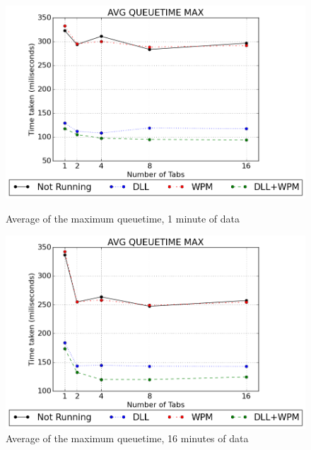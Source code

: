 \begin{figure}[h]
	\centering
    \includegraphics[width=\textwidth,height=0.45\textheight,keepaspectratio]{Evaluation/experiment1/AVG-QUEUETIME-MAX-1.png}
    \caption{Average of the maximum queuetime, 1 minute of data}
    \label{fig:ex1_avgqueuetimemax_1}

	\vspace*{\floatsep}

    \includegraphics[width=\textwidth,height=0.45\textheight,keepaspectratio]{Evaluation/experiment1/AVG-QUEUETIME-MAX-16.png}
    \caption{Average of the maximum queuetime, 16 minutes of data}
    \label{fig:ex1_avgqueuetimemax_16}
\end{figure}
